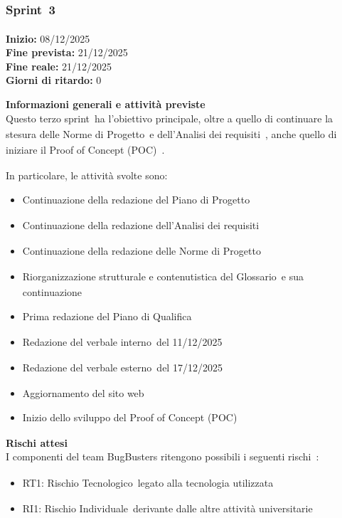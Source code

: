 \documentclass[a4paper,12pt]{article}
\newcommand{\pediceG}{\texorpdfstring{\textsubscript{\scalebox{0.6}{\textbf{G}}}~}{G}}
\begin{document}
\newpage

\subsubsection{Sprint\pediceG 3}

\textbf{Inizio:} 08/12/2025 \\
\textbf{Fine prevista:} 21/12/2025 \\
\textbf{Fine reale:} 21/12/2025 \\
\textbf{Giorni di ritardo:} 0

\noindent\textbf{Informazioni generali e attività previste}\\
Questo terzo sprint\pediceG ha l'obiettivo principale, oltre a quello di continuare la stesura delle Norme di Progetto\pediceG e dell'Analisi dei requisiti\pediceG, anche quello di iniziare il Proof of Concept (POC)\pediceG.

In particolare, le attività svolte sono:
\begin{itemize}
    \item Continuazione della redazione del Piano di Progetto\pediceG
    \item Continuazione della redazione dell'Analisi dei requisiti\pediceG
    \item Continuazione della redazione delle Norme di Progetto\pediceG
    \item Riorganizzazione strutturale e contenutistica del Glossario\pediceG e sua continuazione
    \item Prima redazione del Piano di Qualifica\pediceG
    \item Redazione del verbale interno\pediceG del 11/12/2025
    \item Redazione del verbale esterno\pediceG del 17/12/2025
    \item Aggiornamento del sito web
    \item Inizio dello sviluppo del Proof of Concept (POC)\pediceG
\end{itemize}

\noindent\textbf{Rischi attesi}\\
I componenti del team BugBusters ritengono possibili i seguenti rischi\pediceG:
\begin{itemize}
    \item RT1: Rischio Tecnologico\pediceG legato alla tecnologia utilizzata
    \item RI1: Rischio Individuale\pediceG derivante dalle altre attività universitarie
\end{itemize}
\end{document}
